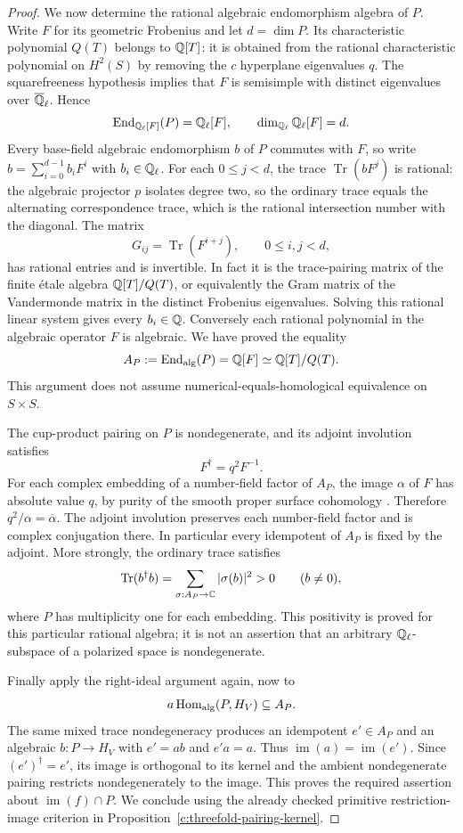 \begin{proof}
We now determine the rational algebraic endomorphism algebra of $P$.
Write $F$ for its geometric Frobenius and let $d=\dim P$. Its
characteristic polynomial $Q(T)$ belongs to $\mathbb Q[T]$: it is obtained
from the rational characteristic polynomial on $H^2(S)$ by removing
the $c$ hyperplane eigenvalues $q$. The squarefreeness hypothesis
implies that $F$ is semisimple with distinct eigenvalues over
$\overline{\mathbb Q}_\ell$. Hence
\[
 \operatorname{End}_{\mathbb Q_\ell[F]}(P)=\mathbb Q_\ell[F],\qquad
 \dim_{\mathbb Q_\ell}\mathbb Q_\ell[F]=d.
\]
Every base-field algebraic endomorphism $b$ of $P$ commutes with $F$,
so write $b=\sum_{i=0}^{d-1}b_iF^i$ with $b_i\in\mathbb Q_\ell$.
For each $0\le j<d$, the trace $\operatorname{Tr}(bF^j)$ is rational:
the algebraic projector $p$ isolates degree two, so the ordinary trace
equals the alternating correspondence trace, which is the rational
intersection number with the diagonal. The matrix
\[
 G_{ij}=\operatorname{Tr}(F^{i+j}),\qquad 0\le i,j<d,
\]
has rational entries and is invertible. In fact it is the trace-pairing
matrix of the finite étale algebra $\mathbb Q[T]/Q(T)$, or equivalently the
Gram matrix of the Vandermonde matrix in the distinct Frobenius
eigenvalues. Solving this rational linear system gives every $b_i\in\mathbb Q$.
Conversely each rational polynomial in the algebraic operator $F$ is
algebraic. We have proved the equality
\[
 A_P:=\operatorname{End}_{\rm alg}(P)=\mathbb Q[F]\simeq\mathbb Q[T]/Q(T).
\]
This argument does not assume numerical-equals-homological equivalence
on $S\times S$.

The cup-product pairing on $P$ is nondegenerate, and its adjoint
involution satisfies
\[
 F^\dagger=q^2F^{-1}.
\]
For each complex embedding of a number-field factor of $A_P$, the
image $\alpha$ of $F$ has absolute value $q$, by purity of the smooth
proper surface cohomology
\citep[Corollary~3.3.9, p.~207]{c_deligneweil1980}.
Therefore $q^2/\alpha=\overline\alpha$.
The adjoint involution preserves each number-field factor and is
complex conjugation there. In particular every idempotent of $A_P$
is fixed by the adjoint. More strongly, the ordinary trace satisfies
\[
 \operatorname{Tr}(b^\dagger b)
   =\sum_{\sigma:A_P\to\mathbb C}|\sigma(b)|^2>0
 \qquad(b\ne0),
\]
where $P$ has multiplicity one for each embedding. This positivity
is proved for this particular rational algebra; it is not an assertion
that an arbitrary $\mathbb Q_\ell$-subspace of a polarized space is
nondegenerate.

Finally apply the right-ideal argument again, now to
\[
 a\operatorname{Hom}_{\rm alg}(P,H_V)\subseteq A_P.
\]
The same mixed trace nondegeneracy produces an idempotent $e'\in A_P$
and an algebraic $b:P\to H_V$ with $e'=ab$ and $e'a=a$.
Thus $\operatorname{im}(a)=\operatorname{im}(e')$. Since
$(e')^\dagger=e'$, its image is orthogonal to its kernel and the
ambient nondegenerate pairing restricts nondegenerately to the image.
This proves the required assertion about
$\operatorname{im}(f)\cap P$. We conclude using the already checked
primitive restriction-image criterion in
Proposition~\ref{c:threefold-pairing-kernel}.


\end{proof}

